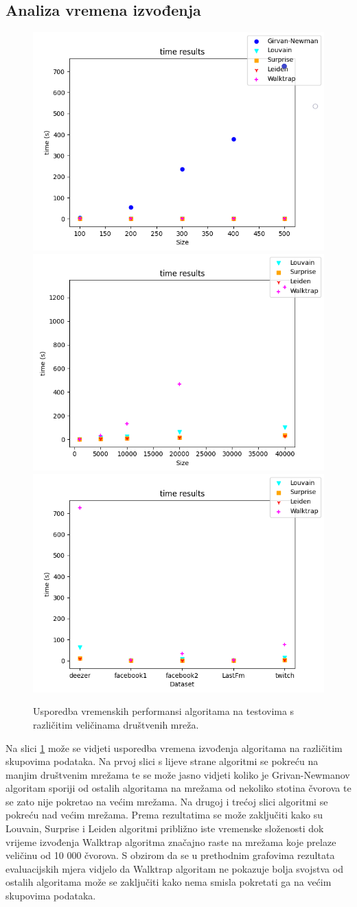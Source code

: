 \subsection{Analiza vremena izvođenja}

\begin{figure}[htp]
	
	\centering
	\includegraphics[width=.3\textwidth]{images/Figure_2_test1_time.png}\hfill
	\includegraphics[width=.3\textwidth]{images/Figure_2_test2_time.png}\hfill
	\includegraphics[width=.3\textwidth]{images/Figure_2_test3_time.png}
	\caption{Usporedba vremenskih performansi algoritama na testovima s različitim veličinama društvenih mreža.}
	\label{fig:time_comparison}
	
\end{figure}

Na slici \ref{fig:time_comparison} može se vidjeti usporedba vremena izvođenja algoritama na različitim skupovima podataka. Na prvoj slici s lijeve strane algoritmi se pokreću na manjim društvenim mrežama te se može jasno vidjeti koliko je Grivan-Newmanov algoritam sporiji od ostalih algoritama na mrežama od nekoliko stotina čvorova te se zato nije pokretao na većim mrežama. Na drugoj i trećoj slici algoritmi se pokreću nad većim mrežama. Prema rezultatima se može zaključiti kako su Louvain, Surprise i Leiden algoritmi približno iste vremenske složenosti dok vrijeme izvođenja Walktrap algoritma značajno raste na mrežama koje prelaze veličinu od 10 000 čvorova. S obzirom da se u prethodnim grafovima rezultata evaluacijskih mjera vidjelo da Walktrap algoritam ne pokazuje bolja svojstva od ostalih algoritama može se zaključiti kako nema smisla pokretati ga na većim skupovima podataka.